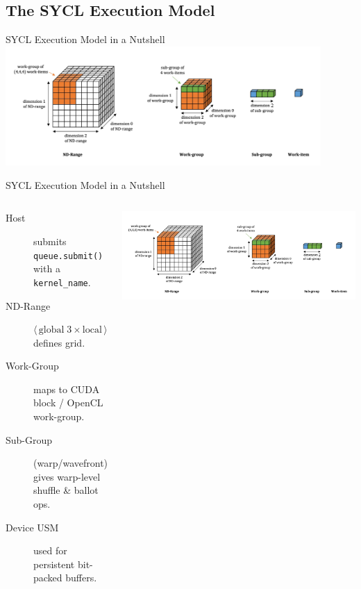 \subsection{The SYCL Execution Model}
\begin{frame}{SYCL Execution Model in a Nutshell}
      \centering
      \includegraphics[width=0.9\textwidth]{2_framework/research_objective_2_sycl_eval/sycl.png}\par %
\end{frame}


\begin{frame}{SYCL Execution Model in a Nutshell}
  \begin{columns}
      \tiny
      \begin{description}
        \item[Host] submits \texttt{queue.submit()} with a \texttt{kernel\_name}.
        \item[ND-Range] $\langle\,\text{global}\;3\!\times\!\text{local}\,\rangle$ defines grid.
        \item[Work-Group] maps to CUDA block / OpenCL work-group.
        \item[Sub-Group] (warp/wavefront) gives warp-level shuffle & ballot ops.
        \item[Device USM] used for persistent bit-packed buffers.
      \end{description}
      \centering
      \includegraphics[width=1\textwidth]{2_framework/research_objective_2_sycl_eval/sycl.png}\par %
  \end{columns}
\end{frame}

